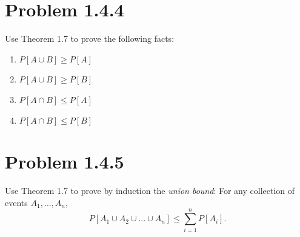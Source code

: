 \documentclass{article}
\begin{document}
\newpage

\section*{Problem 1.4.4}
Use Theorem 1.7 to prove the following facts:
\begin{enumerate}[label=(\alph*)]
    \item $P[A \cup B] \ge P[A]$
    \vspace{1.5in}
    \item $P[A \cup B] \ge P[B]$
    \vspace{1.5in}
    \item $P[A \cap B] \le P[A]$
    \vspace{1.5in}
    \item $P[A \cap B] \le P[B]$
    \vspace{1.5in}
\end{enumerate}

\newpage

\section*{Problem 1.4.5}
Use Theorem 1.7 to prove by induction the \textit{union bound}: For any collection of events $A_1, \dots, A_n$,
\[ P[A_1 \cup A_2 \cup \dots \cup A_n] \le \sum_{i=1}^n P[A_i]. \]
\vspace{3in}
\end{document}
